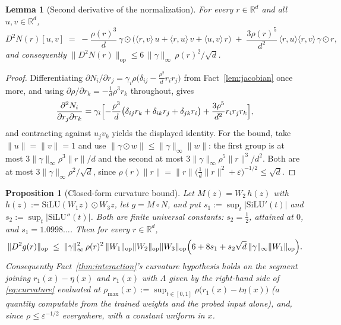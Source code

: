 \documentclass[11pt,a4paper]{article}
\newtheorem{proposition}{Proposition}
\newtheorem{lemma}{Lemma}
\begin{document}
\begin{lemma}[Second derivative of the normalization]
\label{lem:d2norm}
For every $r\in\mathbb R^d$ and all $u,v\in\mathbb R^d$,
\[
D^2N(r)[u,v] \;=\; -\frac{\rho(r)^3}{d}\,\gamma\odot
\bigl(\langle r,v\rangle\,u+\langle r,u\rangle\,v+\langle u,v\rangle\,r\bigr)
\;+\;\frac{3\rho(r)^5}{d^2}\,\langle r,u\rangle\langle r,v\rangle\,\gamma\odot r ,
\]
and consequently
$\|D^2N(r)\|_{\mathrm{op}}\le 6\,\|\gamma\|_\infty\,\rho(r)^2/\sqrt d$.
\end{lemma}

\begin{proof}
Differentiating $\partial N_i/\partial r_j=\gamma_i\rho\bigl(\delta_{ij}
-\tfrac{\rho^2}{d}r_ir_j\bigr)$ from Fact~\ref{lem:jacobian} once more, and
using $\partial\rho/\partial r_k=-\tfrac1d\rho^3r_k$ throughout, gives
\[
\frac{\partial^2N_i}{\partial r_j\partial r_k}
=\gamma_i\Bigl[-\frac{\rho^3}{d}\bigl(\delta_{ij}r_k+\delta_{ik}r_j+\delta_{jk}r_i\bigr)
+\frac{3\rho^5}{d^2}r_ir_jr_k\Bigr],
\]
and contracting against $u_jv_k$ yields the displayed identity. For the bound,
take $\|u\|=\|v\|=1$ and use $\|\gamma\odot w\|\le\|\gamma\|_\infty\|w\|$: the
first group is at most $3\|\gamma\|_\infty\rho^3\|r\|/d$ and the second at most
$3\|\gamma\|_\infty\rho^5\|r\|^3/d^2$. Both are at most
$3\|\gamma\|_\infty\rho^2/\sqrt d$, since
$\rho(r)\|r\|=\|r\|\bigl(\tfrac1d\|r\|^2+\varepsilon\bigr)^{-1/2}\le\sqrt d$.
\end{proof}

\begin{proposition}[Closed-form curvature bound]
\label{prop:curvature}
Let $M(z)=W_2\,h(z)$ with $h(z):=\mathrm{SiLU}(W_1z)\odot W_3z$, let
$g=M\circ N$, and put $s_1:=\sup_t|\mathrm{SiLU}'(t)|$ and
$s_2:=\sup_t|\mathrm{SiLU}''(t)|$. Both are finite universal constants:
$s_2=\tfrac12$, attained at $0$, and $s_1=1.0998\ldots$. Then for every
$r\in\mathbb R^d$,
\begin{equation}
\label{eq:curvature}
\|D^2g(r)\|_{\mathrm{op}} \;\le\;
\|\gamma\|_\infty^2\,\rho(r)^2\,
\|W_1\|_{\mathrm{op}}\|W_2\|_{\mathrm{op}}\|W_3\|_{\mathrm{op}}
\Bigl(6+8s_1+s_2\sqrt d\,\|\gamma\|_\infty\|W_1\|_{\mathrm{op}}\Bigr).
\end{equation}
Consequently Fact~\ref{thm:interaction}'s curvature hypothesis holds on the
segment joining $r_1(x)-\eta(x)$ and $r_1(x)$ with $\Lambda$ given by the
right-hand side of \eqref{eq:curvature} evaluated at
$\rho_{\max}(x):=\sup_{t\in[0,1]}\rho\bigl(r_1(x)-t\eta(x)\bigr)$ (a
quantity computable from the trained weights and the probed input alone), and,
since $\rho\le\varepsilon^{-1/2}$ everywhere, with a constant uniform in $x$.
\end{proposition}
\end{document}
